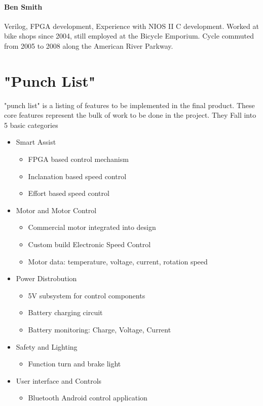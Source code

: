 \documentclass[12pt,article]{IEEEtran}
\begin{document}
    \paragraph{\bfseries Ben Smith}
        Verilog, FPGA development, Experience with NIOS II C development. Worked at bike shops since 
        2004, still employed at the Bicycle Emporium. Cycle commuted from 2005 to 2008 along the
        American River Parkway.

\section{"Punch List"}
     "punch list" is a listing of features to be implemented in the final
        product. These core features represent the bulk of work to be done in the project. They Fall
        into 5 basic categories
    \begin{itemize}
        \item Smart Assist
            \begin{itemize}
                \item FPGA based control mechanism
                \item Inclanation based speed control
                \item Effort based speed control
            \end{itemize}
        \item Motor and Motor Control 
            \begin{itemize}
                \item Commercial motor integrated into design
                \item Custom build Electronic Speed Control
                \item Motor data: temperature, voltage, current, rotation speed
            \end{itemize}
        \item Power Distrobution 
            \begin{itemize}
                \item 5V subsystem for control components
                \item Battery charging circuit
                \item Battery monitoring: Charge, Voltage, Current
            \end{itemize}
        \item Safety and Lighting
            \begin{itemize}
                \item Function turn and brake light
            \end{itemize}
        \item User interface and Controls
            \begin{itemize}
                \item Bluetooth Android control application
            \end{itemize}
        \end{itemize}
\end{document}
